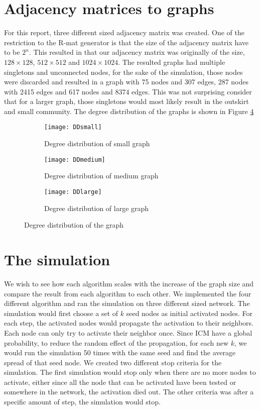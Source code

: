\section{Adjacency matrices to graphs}
For this report, three different sized adjacency matrix was created. One of the restriction to the R-mat generator is that the size of the adjacency matrix have to be $2^n$. This resulted in that our adjacency matrix was originally of the size, $128 \times 128$, $512 \times 512$ and $1024 \times 1024$. The resulted graphs had multiple singletons and unconnected nodes, for the sake of the simulation, those nodes were discarded and resulted in a graph with 75 nodes and 307 edges, 287 nodes with 2415 edges and 617 nodes and 8374 edges. This was not surprising consider that for a larger graph, those singletons would most likely result in the outskirt and small community. The degree distribution of the graphs is shown in Figure \ref{fig:DD}

\begin{figure}[!ht]
	\begin{subfigure}{0.3\textwidth}
		\texttt{[image: DDsmall]}
		\caption{Degree distribution of small graph} 
		\label{fig:linearThresh}
	\end{subfigure}
	\begin{subfigure}{0.3\textwidth}
		\texttt{[image: DDmedium]}
		\caption{Degree distribution of medium graph} 
		\label{fig:linearThresh2}
	\end{subfigure}
	\begin{subfigure}{0.3\textwidth}
		\texttt{[image: DDlarge]}
		\caption{Degree distribution of large graph} 
		\label{fig:linearThresh3}
	\end{subfigure}
	\caption{Degree distribution of the graph}
	\label{fig:DD}
\end{figure}



\section{The simulation}
We wish to see how each algorithm scales with the increase of the graph size and compare the result from each algorithm to each other. We implemented the four different algorithm and ran the simulation on three different sized network. The simulation would first choose a set of $k$ seed nodes as initial activated nodes. For each step, the activated nodes would propagate the activation to their neighbors. Each node can only try to activate their neighbor once. Since ICM have a global probability, to reduce the random effect of the propagation, for each new $k$, we would run the simulation 50 times with the same seed and find the average spread of that seed node. We created two different stop criteria for the simulation. The first simulation would stop only when there are no more nodes to activate, either since all the node that can be activated have been tested or somewhere in the network, the activation died out. The other criteria was after a specific amount of step, the simulation would stop.

